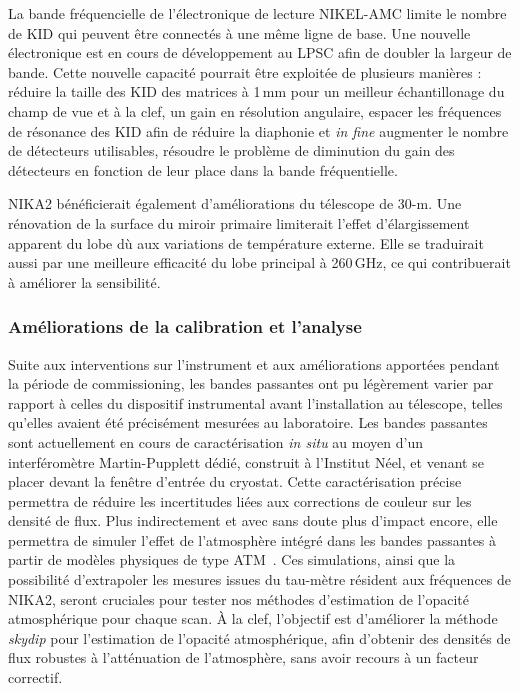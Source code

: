 La bande fréquencielle de l'électronique de lecture NIKEL-AMC limite
le nombre de KID qui peuvent être connectés à une même ligne de
base. Une nouvelle électronique est en cours de développement au LPSC
afin de doubler la largeur de bande. Cette nouvelle capacité pourrait
être exploitée de plusieurs manières : réduire la taille des KID des
matrices à 1\,mm pour un meilleur échantillonage du champ de vue et à
la clef, un gain en résolution angulaire, espacer les fréquences de
résonance des KID afin de réduire la diaphonie et \emph{in fine}
augmenter le nombre de détecteurs utilisables, résoudre le problème de
diminution du gain des détecteurs en fonction de leur place dans la
bande fréquentielle. 

NIKA2 bénéficierait également d'améliorations du télescope de
30-m. Une rénovation de la surface du miroir primaire limiterait
l'effet d'élargissement apparent du lobe dù aux variations de
température externe. Elle se traduirait aussi par une meilleure
efficacité du lobe principal à 260\,GHz, ce qui contribuerait à
améliorer la sensibilité. 

\subsubsection{Améliorations de la calibration et l'analyse}

Suite aux interventions sur l'instrument et aux améliorations
apportées pendant la période de commissioning, les bandes passantes
ont pu légèrement varier par rapport à celles du dispositif
instrumental avant l'installation au télescope, telles qu'elles
avaient été précisément mesurées au laboratoire. Les bandes passantes
sont actuellement en cours de caractérisation \emph{in situ} au moyen
d'un interféromètre Martin-Pupplett dédié, construit à l'Institut
Néel, et venant se placer devant la fenêtre d'entrée du
cryostat. Cette caractérisation précise permettra de réduire les
incertitudes liées aux corrections de couleur sur les
densité de flux. Plus indirectement et avec sans doute plus d'impact
encore, elle permettra de simuler l'effet de l'atmosphère intégré dans
les bandes passantes à partir de modèles physiques de type
ATM~\citep{Pardo2001, ATM}. Ces simulations, ainsi que la possibilité
d'extrapoler les mesures issues du tau-mètre résident aux fréquences
de NIKA2, seront cruciales pour tester nos méthodes d'estimation de
l'opacité atmosphérique pour chaque scan. \`A la clef, l'objectif est
d'améliorer la méthode \emph{skydip} pour l'estimation de l'opacité
atmosphérique, afin d'obtenir des densités de flux robustes à
l'atténuation de l'atmosphère, sans avoir recours à un facteur
correctif.

